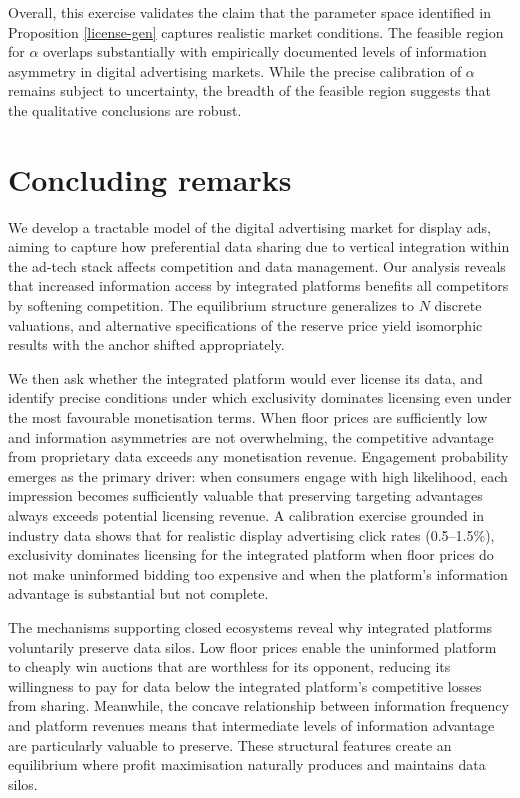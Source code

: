\documentclass[11pt]{article}
\theoremstyle{plain}
\theoremstyle{definition}
\theoremstyle{plain}
\theoremstyle{plain}
\theoremstyle{plain}
\theoremstyle{plain}
\numberwithin{equation}{section}
\begin{document}
\noindent Overall, this exercise validates the claim that the parameter space identified in Proposition \ref{license-gen} captures realistic market conditions. The feasible region for $\alpha$ overlaps substantially with empirically documented levels of information asymmetry in digital advertising markets. While the precise calibration of $\alpha$ remains subject to uncertainty, the breadth of the feasible region suggests that the qualitative conclusions are robust. 


\vspace{8mm}
 
\section{Concluding remarks}\label{sect:conclusion}

We develop a tractable model of the digital advertising market for display ads, aiming to capture how preferential data sharing due to vertical integration within the ad-tech stack affects competition and data management. Our analysis reveals that increased information access by integrated platforms benefits all competitors by softening competition. The equilibrium structure generalizes to $ N $ discrete valuations, and alternative specifications of the reserve price yield isomorphic results with the anchor shifted appropriately. \par 
\vspace{2mm}
\noindent We then ask whether the integrated platform would ever license its data, and identify precise conditions under which exclusivity dominates licensing even under the most favourable monetisation terms. When floor prices are sufficiently low and information asymmetries are not overwhelming, the competitive advantage from proprietary data exceeds any monetisation revenue. Engagement probability emerges as the primary driver: when consumers engage with high likelihood, each impression becomes sufficiently valuable that preserving targeting advantages always exceeds potential licensing revenue. A calibration exercise grounded in industry data shows that for realistic display advertising click rates (0.5--1.5\%), exclusivity dominates licensing for the integrated platform when floor prices do not make uninformed bidding too expensive and when the platform's information advantage is substantial but not complete. \par
The mechanisms supporting closed ecosystems reveal why integrated platforms voluntarily preserve data silos. Low floor prices enable the uninformed platform to cheaply win auctions that are worthless for its opponent, reducing its willingness to pay for data below the integrated platform's competitive losses from sharing. Meanwhile, the concave relationship between information frequency and platform revenues means that intermediate levels of information advantage are particularly valuable to preserve. These structural features create an equilibrium where profit maximisation naturally produces and maintains data silos.\par
\end{document}
